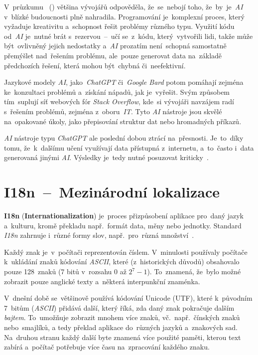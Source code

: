 \documentclass[11pt,a4paper]{report}
\begin{document}
            V~průzkumu ~(\cite{zerotomasteryStateOfAI}) většina vývojářů odpověděla, že~se~nebojí toho, že~by~je~\emph{AI} v~blízké budoucnosti plně nahradila. Programování je~komplexní proces, který vyžaduje kreativitu a~schopnost řešit problémy různého typu. Využití kódu od~\emph{AI} je~nutné brát s~rezervou~--~učí se~z~kódu, který~vytvořili lidi, takže může být~ovlivněný jejich nedostatky a~\emph{AI} prozatím není~schopná samostatně přemýšlet nad~řešením problému, ale~pouze generovat data na~základě předchozích řešení, která mohou být~chybná či~neefektivní.
            
            Jazykové modely \emph{AI}, jako~\emph{ChatGPT} či~\emph{Google Bard} potom pomáhají zejména ke~konzultaci problémů a~získání nápadů, jak je~vyřešit. Svým způsobem tím~suplují síť webových fór \emph{Stack Overflow}, kde~si vývojáři navzájem radí s~řešením problémů, zejména z~oboru~\emph{IT}. Tyto \emph{AI} nástroje jsou skvělé na~opakované úkoly, jako přepisování struktur dat nebo hromadných příkazů.

            \emph{AI} nástroje typu \emph{ChatGPT} ale poslední dobou ztrácí na~přesnosti. Je~to~díky tomu, že~k~dalšímu učení využívají data přístupná z~internetu, a~to~často i~data generovaná jinými \emph{AI}. Výsledky je~tedy nutné posuzovat kriticky~\cite{computerworld:AI}.

        \section{I18n~--~Mezinárodní lokalizace}
            \textbf{I18n} (\textbf{Internationalization}) je~proces přizpůsobení aplikace pro~daný jazyk a~kulturu, kromě překladu např.~formát data, měny nebo jednotky. Standard \emph{I18n} zahrnuje i~různé formy slov, např.~pro~různá množství~\cite{w3Internationalization}.

            Každý znak je~v~počítači reprezentován číslem. V~minulosti používaly počítače k~ukládání znaků kódování \emph{ASCII}, které (z~historických důvodů) obsahovalo pouze 128~znaků (7 bitů v~rozsahu $0$ až $2^7 - 1$). To~znamená, že~bylo možné zobrazit pouze anglické texty a~některá interpunkční znaménka. 
            
            V~dnešní době se~většinově používá kódování Unicode (UTF), které k~původním 7~bitům (\emph{ASCII}) přidává další, který říká, zda daný znak pokračuje dalším \emph{bajtem}. To~umožňuje zobrazit mnohem více znaků, vč.~např.~čínských znaků nebo~smajlíků, a tedy překlad aplikace do~různých jazyků a~znakových sad. Na~druhou stranu každý další byte znamená více použité paměti, kterou text zabírá a~počítač potřebuje více času na~zpracování každého znaku.
            
\end{document}
